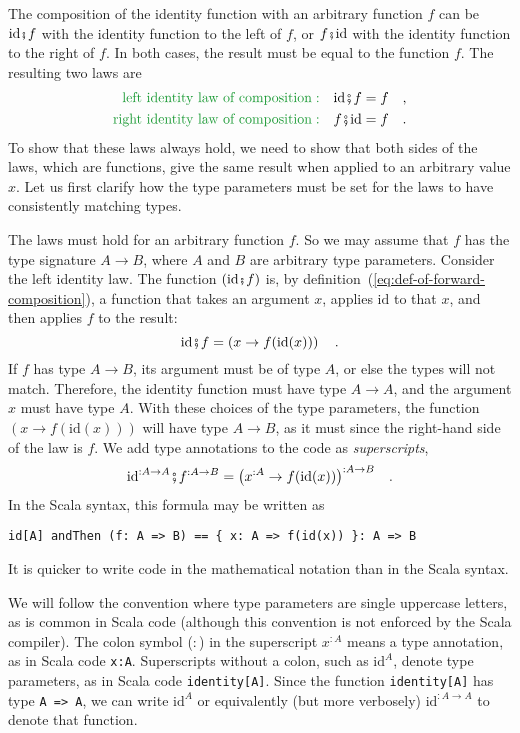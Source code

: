 The composition of the identity function with an arbitrary function
$f$ can be $\text{id}\bef f$ with the identity function to the left
of $f$, or $f\bef\text{id}$ with the identity function to the right
of $f$. In both cases, the result must be equal to the function $f$.
The resulting two laws are
\begin{align*}
{\color{greenunder}\text{left identity law of composition}:}\quad & \text{id}\bef f=f\quad,\\
{\color{greenunder}\text{right identity law of composition}:}\quad & f\bef\text{id}=f\quad.
\end{align*}
To show that these laws always hold, we need to show that both sides
of the laws, which are functions, give the same result when applied
to an arbitrary value $x$. Let us first clarify how the type parameters
must be set for the laws to have consistently matching types.

The laws must hold for an arbitrary function $f$. So we may assume
that $f$ has the type signature $A\rightarrow B$, where $A$ and
$B$ are arbitrary type parameters. Consider the left identity law.
The function $(\text{id}\bef f)$ is, by definition~(\ref{eq:def-of-forward-composition}),
a function that takes an argument $x$, applies $\text{id}$ to that
$x$, and then applies $f$ to the result: 
\[
\text{id}\bef f=\left(x\rightarrow f(\text{id}(x))\right)\quad.
\]
If $f$ has type $A\rightarrow B$, its argument must be of type $A$,
or else the types will not match. Therefore, the identity function
must have type $A\rightarrow A$, and the argument $x$ must have
type $A$. With these choices of the type parameters, the function
$\left(x\rightarrow f(\text{id}(x))\right)$ will have type $A\rightarrow B$,
as it must since the right-hand side of the law is $f$. We add type
annotations to the code as \emph{superscripts},
\[
\text{id}^{:A\rightarrow A}\bef f^{:A\rightarrow B}=\big(x^{:A}\rightarrow f(\text{id}(x))\big)^{:A\rightarrow B}\quad.
\]
In the Scala syntax, this formula may be written as
\begin{lstlisting}
id[A] andThen (f: A => B) == { x: A => f(id(x)) }: A => B
\end{lstlisting}
It is quicker to write code in the mathematical notation than in the
Scala syntax. 

We will follow the convention where type parameters are single uppercase
letters, as is common in Scala code (although this convention is not
enforced by the Scala compiler). The colon symbol ($:$) in the superscript
$x^{:A}$ means a type annotation, as in Scala code \lstinline!x:A!.
Superscripts without a colon, such as $\text{id}^{A}$, denote type
parameters, as in Scala code \lstinline!identity[A]!. Since the function
\lstinline!identity[A]! has type \lstinline!A => A!, we can write
$\text{id}^{A}$ or equivalently (but more verbosely) $\text{id}^{:A\rightarrow A}$
to denote that function.

